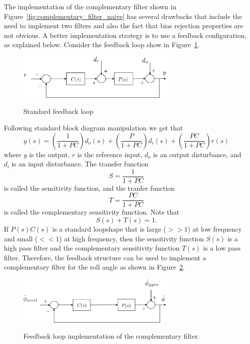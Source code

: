 The implementation of the complementary filter shown in Figure~\ref{fig:complementary_filter_naive} has several drawbacks that include the need to implement two filters and also the fact that bias rejection properties are not obvious.  A better implementation strategy is to use a feedback configuration, as explained below.  Consider the feedback loop show in Figure~\ref{fig:feedback_loop}.
\begin{figure}[hhhhtb]
  \centering
  \includegraphics[width=0.7\textwidth]{chap11_attitude_estimation/figures/feedback_loop}\\
  \caption{Standard feedback loop}%
  \label{fig:feedback_loop}
\end{figure}
Following standard block diagram manipulation we get that
$$
y(s) = \left(\frac{1}{1+PC}\right) d_o(s) + \left(\frac{P}{1+PC}\right) d_i(s) + \left(\frac{PC}{1+PC}\right) r(s)
$$
where $y$ is the output, $r$ is the reference input, $d_o$ is an output disturbance, and $d_i$ is an input disturbance.  The transfer function 
$$
S=\frac{1}{1+PC}
$$ 
is called the sensitivity function, and the tranfer function 
$$
T=\frac{PC}{1+PC}
$$ 
is called the complementary sensitivity function.  Note that 
$$
S(s) + T(s) = 1.
$$
If $P(s) C(s)$ is a standard loopshape that is large ($>> 1$) at low frequency and small ($<< 1$) at high frequency, then the sensitivity function $S(s)$ is a high pass filter and the complementary sensitivity function $T(s)$ is a low pass filter.  Therefore, the feedback structure can be used to implement a complementary filter for the roll angle as shown in Figure~\ref{fig:complementary_filter_roll_1}.
\begin{figure}[hhhhtb]
  \centering
  \includegraphics[width=0.7\textwidth]{chap11_attitude_estimation/figures/complementary_filter_roll_1}\\
  \caption{Feedback loop implementation of the complementary filter.}%
  \label{fig:complementary_filter_roll_1}
\end{figure}

